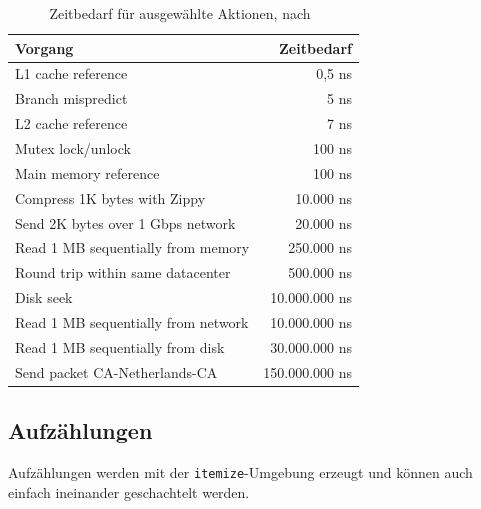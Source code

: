 \documentclass[conference,compsoc,final,a4paper]{IEEEtran}
\begin{document}
    \begin{table}[!ht]
        \centering
        \rmfamily
        \caption{Zeitbedarf für ausgewählte Aktionen, nach~\cite{Dean2012}}
        \renewcommand{\arraystretch}{1.1}
        \sffamily
        \begin{footnotesize}
            \begin{tabular}{l r}
                \toprule
                \textbf{Vorgang}                    & \textbf{Zeitbedarf} \\
                \midrule
                L1 cache reference                  & 0,5 ns              \\
                Branch mispredict                   & 5 ns                \\
                L2 cache reference                  & 7 ns                \\
                Mutex lock/unlock                   & 100 ns              \\
                Main memory reference               & 100 ns              \\
                Compress 1K bytes with Zippy        & 10.000 ns           \\
                Send 2K bytes over 1 Gbps network   & 20.000 ns           \\
                Read 1 MB sequentially from memory  & 250.000 ns          \\
                Round trip within same datacenter   & 500.000 ns          \\
                Disk seek                           & 10.000.000 ns       \\
                Read 1 MB sequentially from network & 10.000.000 ns       \\
                Read 1 MB sequentially from disk    & 30.000.000 ns       \\
                Send packet CA-Netherlands-CA       & 150.000.000 ns      \\
                \bottomrule
            \end{tabular}
        \end{footnotesize}
        \label{google:numbers}
    \end{table}

    \subsection{Aufzählungen}
    Aufzählungen werden mit der \texttt{itemize}-Umgebung erzeugt und können auch einfach ineinander geschachtelt werden.
\end{document}

